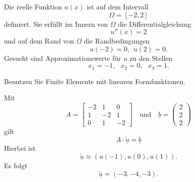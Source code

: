 Die reelle Funktion $u(x)$ ist auf dem Intervall
\[
\Omega = [-2, 2]
\]
definiert. Sie erfüllt im Innern von $\Omega$ die Differentialgleichung 
\[
u''(x) = 2
\]
und auf dem Rand von $\Omega$ die Randbedingungen 
\[
u(-2) = 0, \ \ u(2) = 0.
\]
Gesucht sind Approximationswerte für $u$ zu den Stellen
\[
x_1 = -1, \ \ \ x_2 = 0, \ \ \  x_3 = 1.
\]

Benutzen Sie Finite Elemente mit linearen Formfunktionen.

\begin{loesung}
Mit
\[
A
=
\left[\begin{array}{rrr} -2 & 1 & 0 \\ 1 & -2 & 1 \\ 0 & 1 & -2  \end{array}\right]
\quad\mbox{und}\quad
\underline{b} =  \left(\begin{array}{r} 2 \\ 2 \\ 2 \end{array}\right)
\]
gilt  
\[
A \cdot \underline{\tilde u} = \underline{b}
\]
Hierbei ist
\[
\underline{\tilde u} \approx (u(-1), u(0), u(1)).
\]
Es folgt 
\[
\underline{\tilde u} = (-3,-4,-3).
\]
\end{loesung}

